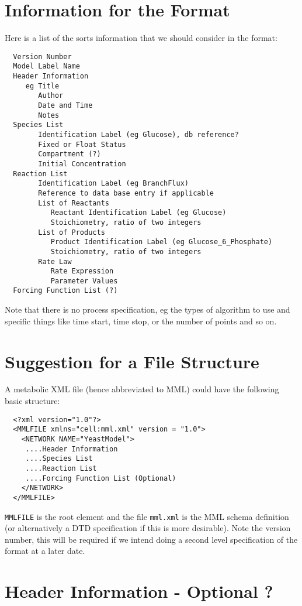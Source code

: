 \documentclass{article}
\begin{document}
\section*{Information for the Format}

Here is a list of the sorts information that we should consider in the format:

\begin{verbatim}
  Version Number
  Model Label Name
  Header Information
     eg Title
        Author
        Date and Time
        Notes
  Species List
        Identification Label (eg Glucose), db reference?
        Fixed or Float Status
        Compartment (?)
        Initial Concentration
  Reaction List
        Identification Label (eg BranchFlux)
        Reference to data base entry if applicable
        List of Reactants
           Reactant Identification Label (eg Glucose)
           Stoichiometry, ratio of two integers
        List of Products
           Product Identification Label (eg Glucose_6_Phosphate)
           Stoichiometry, ratio of two integers
        Rate Law
           Rate Expression
           Parameter Values
  Forcing Function List (?)
\end{verbatim}

Note that there is no process specification, eg the types of algorithm to use
and specific things like time start, time stop, or the number of points and so
on.

\section*{Suggestion for a File Structure}

A metabolic XML file (hence abbreviated to MML) could have the following basic
structure:

\begin{verbatim}
  <?xml version="1.0"?>
  <MMLFILE xmlns="cell:mml.xml" version = "1.0">
    <NETWORK NAME="YeastModel">
     ....Header Information
     ....Species List
     ....Reaction List
     ....Forcing Function List (Optional)
    </NETWORK>
  </MMLFILE>
\end{verbatim}

{\tt MMLFILE} is the root element and the file {\tt mml.xml} is the MML schema
definition (or alternatively a DTD specification if this is more desirable).
Note the version number, this will be required if we intend doing a second
level specification of the format at a later date.


\section*{Header Information - Optional ?}
\end{document}
